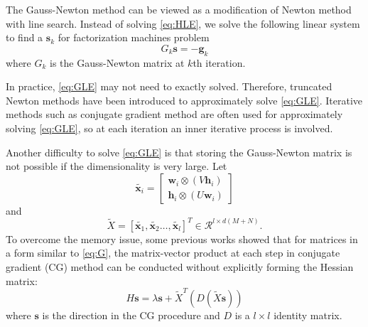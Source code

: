 \documentclass[11pt,twoside]{article}
\newcommand{\bsym}[1]{\ensuremath{\boldsymbol{#1}}}
\newcommand{\bw}{\ensuremath{\bsym{w}}}
\newcommand{\bx}{\ensuremath{\bsym{x}}}
\newcommand{\bh}{\ensuremath{\bsym{h}}}
\newcommand{\bs}{\ensuremath{\bsym{s}}}
\newcommand{\bg}{\ensuremath{\bsym{g}}}
\newcommand{\bbr}{\ensuremath{\mathcal R}}
\begin{document}
The Gauss-Newton method can be viewed as a modification of Newton method with line search. Instead of solving \eqref{eq:HLE}, we solve the following linear system to find a $\bs_k$ for factorization machines problem
\begin{equation}
	G_k\bs = -\bg_k
\label{eq:GLE}
\end{equation}
where $G_k$ is the Gauss-Newton matrix at $k$th iteration.


In practice, \eqref{eq:GLE} may not need to exactly solved. Therefore, truncated Newton methods have been introduced to approximately solve \eqref{eq:GLE}. Iterative methods such as conjugate gradient method are often used for approximately solving \eqref{eq:GLE}, so at each iteration an inner iterative process is involved.

Another difficulty to solve \eqref{eq:GLE} is that storing the Gauss-Newton matrix is not possible if the dimensionality is very large. 
Let
\begin {equation*}
\tilde{\bx_i} = \begin{bmatrix} \bw_i\otimes (V\bh_i) \\ \bh_i\otimes (U\bw_i) \end{bmatrix}
\label{eq:xi}
\end{equation*}
and
\begin {equation*}
\tilde{X} = [\tilde{\bx_1},\tilde{\bx_2}\dots,\tilde{\bx_l}]^T \in \bbr^{l\times d(M+N)}
\label{eq:X}.
\end{equation*}
To overcome the memory issue, 
some previous works showed that for matrices in a form similar to \eqref{eq:G}, the matrix-vector product at each step in conjugate gradient (CG) method can be conducted without explicitly forming the Hessian matrix:
\begin{equation}
    H\bs = \lambda\bs + \tilde{X}^T(D(\tilde{X}\bs))
\label{eq:Hv}
\end{equation}
where $\bs$ is the direction in the CG procedure and $D$ is a $l\times l$ identity matrix. 
\end{document}

